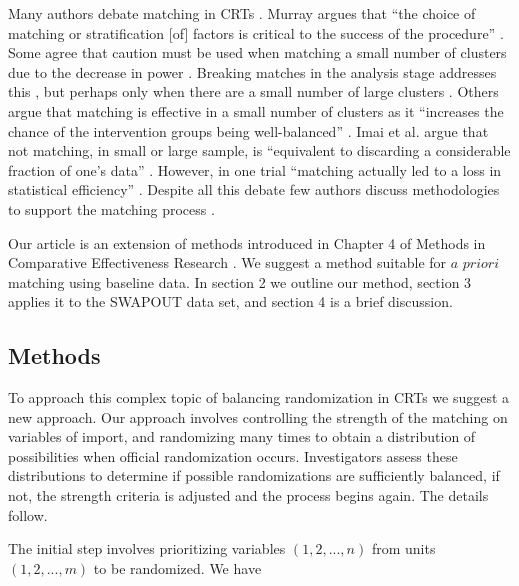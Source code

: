 \documentclass[]{sagej}
\begin{document}
Many authors debate matching in CRTs
\citep{balzer2012match, CRTrials2009, gatsonis2017methods, diehr1995breaking, murray1998design, imai2009essential, PMVsStrat, donner2007merits, klar1997merits, donner2000design, martin1993effect}.
Murray argues that ``the choice of matching or stratification {[}of{]}
factors is critical to the success of the procedure''
\citep{murray1998design}. Some agree that caution must be used when
matching a small number of clusters due to the decrease in power
\citep{donner2000design, klar1997merits, balzer2012match, martin1993effect}.
Breaking matches in the analysis stage addresses this
\citep{diehr1995breaking}, but perhaps only when there are a small
number of large clusters \citep{donner2007merits}. Others argue that
matching is effective in a small number of clusters as it ``increases
the chance of the intervention groups being well-balanced''
\citep{donner2007merits}. Imai et al. argue that not matching, in small
or large sample, is ``equivalent to discarding a considerable fraction
of one's data'' \citep{imai2009essential}. However, in one trial
``matching actually led to a loss in statistical efficiency''
\citep[\citet{donner2000design}]{manun1994influence}. Despite all this
debate few authors discuss methodologies to support the matching process
\citep{raab2001balance}.

Our article is an extension of methods introduced in Chapter 4 of
Methods in Comparative Effectiveness Research
\citep{gatsonis2017methods}. We suggest a method suitable for \(a\)
\(priori\) matching using baseline data. In section 2 we outline our
method, section 3 applies it to the SWAPOUT data set, and section 4 is a
brief discussion.

\subsection{Methods }\label{methods}

To approach this complex topic of balancing randomization in CRTs we
suggest a new approach. Our approach involves controlling the strength
of the matching on variables of import, and randomizing many times to
obtain a distribution of possibilities when official randomization
occurs. Investigators assess these distributions to determine if
possible randomizations are sufficiently balanced, if not, the strength
criteria is adjusted and the process begins again. The details follow.

The initial step involves prioritizing variables \((1, 2,..., n)\) from
units \((1, 2, ..., m)\) to be randomized. We have
\end{document}
